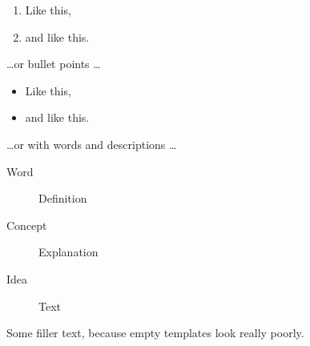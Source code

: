 \begin{enumerate}
\item Like this,
\item and like this.
\end{enumerate}
\dots or bullet points \dots
\begin{itemize} 
\item Like this,
\item and like this.
\end{itemize}
\dots or with words and descriptions \dots
\begin{description}
\item[Word] Definition
\item[Concept] Explanation
\item[Idea] Text
\end{description}

Some filler text, because empty templates look really poorly. \lipsum[1]